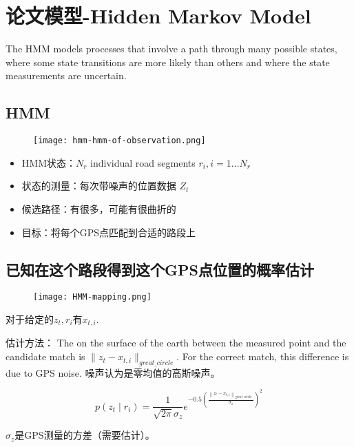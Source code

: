 \section{论文模型-Hidden Markov Model}

The HMM models processes that involve a path through many
possible states, where some state transitions are more likely than
others and where the state measurements are uncertain.

\subsection{HMM}

\begin{figure}[h]
    \centering
    \texttt{[image: hmm-hmm-of-observation.png]}
\end{figure}

\begin{itemize}
    \item HMM状态：$ N_{r} $ individual  road  segments $ r_{i},  i=1 \ldots N_{r} $
    \item 状态的测量：每次带噪声的位置数据 $ Z_{t} $
    \item 候选路径：有很多，可能有很曲折的
    \item 目标：将每个GPS点匹配到合适的路段上
\end{itemize}

\subsection{已知在这个路段得到这个GPS点位置的概率估计}

\begin{figure}[h]
    \centering
    \texttt{[image: HMM-mapping.png]}
\end{figure}

对于给定的$z_{t},r_{i} $有$ x_{t, i}$. 

估计方法：
The  on the surface of the earth between the measured point and the candidate match is $ \| z_{t}- x_{t, i} \|_{great\_circle}$. For the correct match, this difference is due to GPS noise. 噪声认为是零均值的高斯噪声。 

$$ p\left(z_{t} \mid r_{i}\right)=\frac{1}{\sqrt{2 \pi} \sigma_{z}} e^{-0.5\left(\frac{\left\|z_{t}-x_{t, i}\right\|_{\text {great circle }}}{\sigma_{z}}\right)^{2}} $$

$\sigma_{z}$是GPS测量的方差（需要估计）。 

